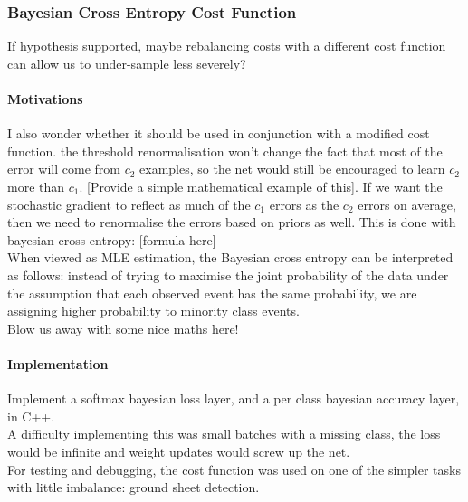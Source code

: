 \documentclass[a4paper,11pt]{article}
\begin{document}
\subsubsection{Bayesian Cross Entropy Cost Function}

If hypothesis supported, maybe rebalancing costs with a different cost function can allow us to under-sample less severely? \\


\paragraph{Motivations}

I also wonder whether it should be used in conjunction with a modified cost function. the threshold renormalisation won't change the fact that most of the error will come from $c_2$ examples, so the net would still be encouraged to learn $c_2$ more than $c_1$. [Provide a simple mathematical example of this]. If we want the stochastic gradient to reflect as much of the $c_1$ errors as the $c_2$ errors on average, then we need to renormalise the errors based on priors as well. This is done with bayesian cross entropy: [formula here] \\

When viewed as MLE estimation, the Bayesian cross entropy can be interpreted as follows: instead of trying to maximise the joint probability of the data under the assumption that each observed event has the same probability, we are assigning higher probability to minority class events. \\

Blow us away with some nice maths here! \\


\paragraph{Implementation}

Implement a softmax bayesian loss layer, and a per class bayesian accuracy layer, in C++. \\

A difficulty implementing this was small batches with a missing class, the loss would be infinite and weight updates would screw up the net. \\

For testing and debugging, the cost function was used on one of the simpler tasks with little imbalance: ground sheet detection. 
\end{document}
